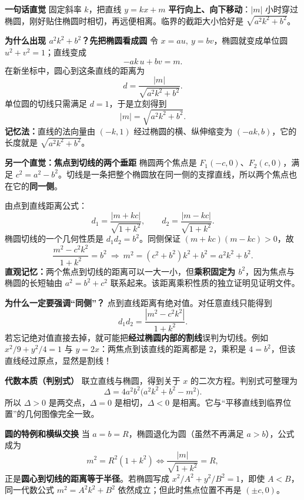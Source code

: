 \begin{explanationbox}
\textbf{\textcolor{CExplanation}{一句话直觉}}
固定斜率 $k$，把直线 $y=kx+m$ \textbf{平行向上、向下移动}：$|m|$ 小时穿过椭圆，刚好贴住椭圆时相切，再远便相离。临界的截距大小恰好是 $\sqrt{a^2k^2+b^2}$。

\medskip
\textbf{\textcolor{CExplanation}{为什么出现 $a^2k^2+b^2$？先把椭圆看成圆}}
令 $x=au,\ y=bv$，椭圆就变成单位圆 $u^2+v^2=1$；直线变成
\[
    -ak\,u+bv=m.
\]
在新坐标中，圆心到这条直线的距离为
\[
    d=\frac{|m|}{\sqrt{a^2k^2+b^2}}.
\]
单位圆的切线只需满足 $d=1$，于是立刻得到
\[
    |m|=\sqrt{a^2k^2+b^2}.
\]
\textbf{记忆法：}直线的法向量由 $(-k,1)$ 经过椭圆的横、纵伸缩变为 $(-ak,b)$，它的长度就是 $\sqrt{a^2k^2+b^2}$。

\medskip
\textbf{\textcolor{CExplanation}{另一个直觉：焦点到切线的两个垂距}}
椭圆两个焦点是 $F_1(-c,0)$、$F_2(c,0)$，满足 $c^2=a^2-b^2$。切线是一条把整个椭圆放在同一侧的支撑直线，所以两个焦点也在它的\textbf{同一侧}。

由点到直线距离公式：
\[
 d_1=\frac{|m+kc|}{\sqrt{1+k^2}},\qquad
 d_2=\frac{|m-kc|}{\sqrt{1+k^2}}.
\]
椭圆切线的一个几何性质是 $d_1d_2=b^2$。同侧保证 $(m+kc)(m-kc)>0$，故
\[
 \frac{m^2-c^2k^2}{1+k^2}=b^2
 \ \Longrightarrow\ 
 m^2=(c^2+b^2)k^2+b^2=a^2k^2+b^2.
\]
\textbf{直观记忆：}两个焦点到切线的距离可以一大一小，但\textbf{乘积固定为 $b^2$}，因为焦点与椭圆的长短轴由 $a^2=b^2+c^2$ 联系起来。该距离乘积性质的独立证明见证明文件。

\medskip
\textbf{\textcolor{CExplanation}{为什么一定要强调“同侧”？}}
点到直线距离有绝对值。对任意直线只能得到
\[
 d_1d_2=\frac{|m^2-c^2k^2|}{1+k^2}.
\]
若忘记绝对值直接去掉，就可能把\textbf{经过椭圆内部的割线}误判为切线。例如 $x^2/9+y^2/4=1$ 与 $y=2x$：两焦点到该直线的距离都是 $2$，乘积是 $4=b^2$，但该直线经过原点，显然是割线！

\medskip
\textbf{\textcolor{CExplanation}{代数本质（判别式）}}
联立直线与椭圆，得到关于 $x$ 的二次方程。判别式可整理为
\[
 \Delta=4a^2b^2\bigl(a^2k^2+b^2-m^2\bigr).
\]
所以 $\Delta>0$ 是两交点，$\Delta=0$ 是相切，$\Delta<0$ 是相离。它与“平移直线到临界位置”的几何图像完全一致。

\medskip
\textbf{\textcolor{CExplanation}{圆的特例和横纵交换}}
当 $a=b=R$，椭圆退化为圆（虽然不再满足 $a>b$），公式成为
\[
 m^2=R^2(1+k^2)
 \iff \frac{|m|}{\sqrt{1+k^2}}=R,
\]
正是\textbf{圆心到切线的距离等于半径}。若椭圆写成 $x^2/A^2+y^2/B^2=1$，即使 $A<B$，同一代数公式 $m^2=A^2k^2+B^2$ 依然成立；但此时焦点位置不再是 $(\pm c,0)$。


\end{explanationbox}
